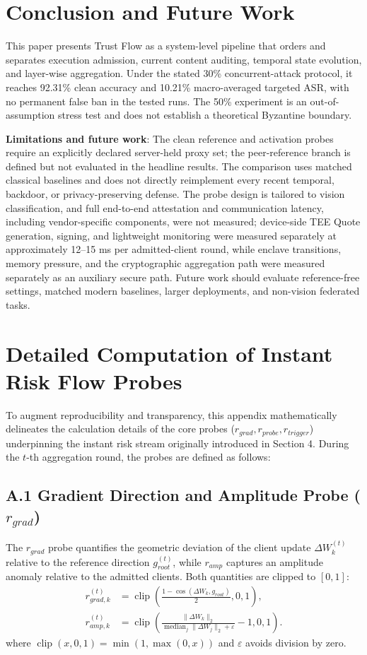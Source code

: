 \documentclass[final,5p,times,twocolumn]{elsarticle/elsarticle}
\begin{document}
\section{Conclusion and Future Work}
This paper presents Trust Flow as a system-level pipeline that orders and
separates execution admission, current content auditing, temporal state
evolution, and layer-wise aggregation. Under the stated 30\% concurrent-attack
protocol, it reaches 92.31\% clean accuracy and 10.21\% macro-averaged targeted
ASR, with no permanent false ban in the tested runs. The 50\% experiment is an
out-of-assumption stress test and does not establish a theoretical Byzantine
boundary.

\textbf{Limitations and future work}: The clean reference and activation probes
require an explicitly declared server-held proxy set; the peer-reference
branch is defined but not evaluated in the headline results. The comparison
uses matched classical baselines and does not directly reimplement every recent
temporal, backdoor, or privacy-preserving defense. The probe design is tailored
to vision classification, and full end-to-end attestation and communication
latency, including vendor-specific components, were not measured; device-side
TEE Quote generation, signing, and lightweight monitoring were measured
separately at approximately 12--15 ms per admitted-client round, while enclave
transitions, memory pressure, and the cryptographic aggregation path were
measured separately as an auxiliary secure path. Future work should evaluate
reference-free settings, matched modern baselines, larger deployments, and
non-vision federated tasks.

\appendix
\section{Detailed Computation of Instant Risk Flow Probes}
To augment reproducibility and transparency, this appendix mathematically delineates the calculation details of the core probes ($r_{grad}, r_{probe}, r_{trigger}$) underpinning the instant risk stream originally introduced in Section 4. During the $t$-th aggregation round, the probes are defined as follows:

\subsection{A.1 Gradient Direction and Amplitude Probe \texorpdfstring{($r_{grad}$)}{(r-grad)}}
The $r_{grad}$ probe quantifies the geometric deviation of the client update $\Delta W_k^{(t)}$ relative to the reference direction $g_{root}^{(t)}$, while $r_{amp}$ captures an amplitude anomaly relative to the admitted clients. Both quantities are clipped to $[0,1]$:
\begin{align}
 r_{grad,k}^{(t)}&=\operatorname{clip}\!\left(
 \frac{1-\cos(\Delta W_k,g_{root})}{2},0,1\right),\\
 r_{amp,k}^{(t)}&=\operatorname{clip}\!\left(
 \frac{\|\Delta W_k\|_2}{\operatorname{median}_j\|\Delta W_j\|_2+\varepsilon}
 -1,0,1\right).
\end{align}
where $\operatorname{clip}(x,0,1)=\min(1,\max(0,x))$ and $\varepsilon$ avoids division by zero.
\end{document}
